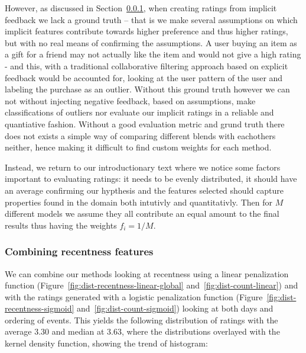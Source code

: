 However, as discussed in Section~\ref{}, when creating ratings from implicit
feedback we lack a ground truth -- that is we make several assumptions on which
implicit features contribute towards higher preference and thus higher ratings,
but with no real means of confirming the assumptions. A user buying an item as
a gift for a friend may not actually like the item and would not give a high
rating - and this, with a traditional collaborative filtering approach based on
explicit feedback would be accounted for, looking at the user pattern of the
user and labeling the purchase as an outlier. Without this ground truth however
we can not without injecting negative feedback, based on assumptions, make
classifications of outliers nor evaluate our implicit ratings in a reliable and
quantiative fashion. Without a good evaluation metric and grund truth there
does not exists a simple way of comparing different blends with eachothers
neither, hence making it difficult to find custom weights for each method.

Instead, we return to our introductionary text where we notice some factors
important to evaluating ratings: it needs to be evenly distributed, it should
have an average confirming our hypthesis and the features selected should
capture properties found in the domain both intutivly and quantitativly.  Then
for $M$ different models we assume they all contribute an equal amount to the
final results thus having the weights $f_i = 1/M$.

\subsubsection{Combining recentness features}

We can combine our methods looking at recentness using a linear penalization
function (Figure~\ref{fig:dist-recentness-linear-global}
and~\ref{fig:dist-count-linear}) and with the ratings generated with a logistic
penalization function (Figure~\ref{fig:dist-recentness-sigmoid}
and~\ref{fig:dist-count-sigmoid}) looking at both days and ordering of events.
This yields the following distribution of ratings with the average $3.30$ and
median at $3.63$, where the distributions overlayed with the kernel density
function, showing the trend of histogram:

